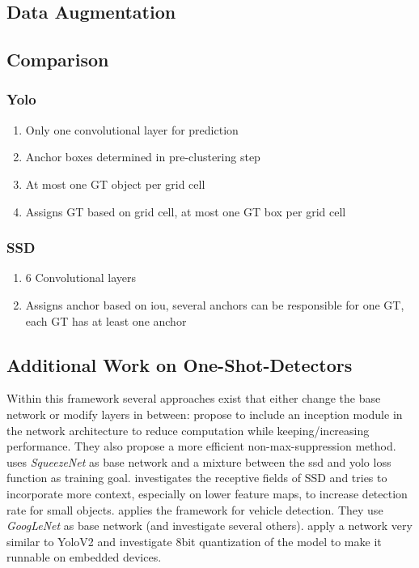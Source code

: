 \documentclass{article}
\begin{document}
	\subsection{Data Augmentation}
	
	\subsection{Comparison}
	\subsubsection{Yolo}
	\begin{enumerate}
		\item Only one convolutional layer for prediction
		\item Anchor boxes determined in pre-clustering step
		\item At most one GT object per grid cell
		\item Assigns GT based on grid cell, at most one GT box per grid cell
	\end{enumerate}
	\subsubsection{SSD}
	\begin{enumerate}
		\item 6 Convolutional layers
		\item Assigns anchor based on iou, several anchors can be responsible for one GT, each GT has at least one anchor
	\end{enumerate}
	
	\subsection{Additional Work on One-Shot-Detectors}
	
	Within this framework several approaches exist that either change the base network or modify layers in between: \cite{ChengchengNing2017} propose to include an inception module in the network architecture to reduce computation while keeping/increasing performance. They also propose a more efficient non-max-suppression method. \cite{Wu} uses \textit{SqueezeNet} as base network and a mixture between the ssd and yolo loss function as training goal. \cite{Xiang} investigates the receptive fields of SSD and tries to incorporate more context, especially on lower feature maps, to increase detection rate for small objects.\cite{Linb} applies the framework for vehicle detection. They use \textit{GoogLeNet} as base network (and investigate several others).\cite{TripathiSanDiego} apply a network very similar to YoloV2 and investigate 8bit quantization of the model to make it runnable on embedded devices.
	
\end{document}
